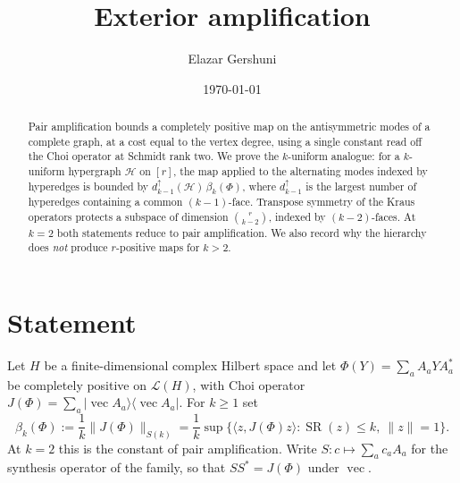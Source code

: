 \documentclass[11pt,reqno]{amsart}
\title{Exterior amplification}
\author{Elazar Gershuni}
\date{\today}
\theoremstyle{plain}
\theoremstyle{remark}
\DeclareMathOperator{\SR}{SR}
\newcommand{\cL}{\mathcal L}
\newcommand{\ketbra}[2]{\lvert #1\rangle\!\langle #2\rvert}
\newcommand{\ip}[2]{\langle #1,#2\rangle}
\newcommand{\norm}[1]{\lVert #1\rVert}
\begin{document}
\begin{abstract}
Pair amplification bounds a completely positive map on the antisymmetric modes
of a complete graph, at a cost equal to the vertex degree, using a single
constant read off the Choi operator at Schmidt rank two.  We prove the
$k$-uniform analogue: for a $k$-uniform hypergraph $\mathcal H$ on $[r]$, the
map applied to the alternating modes indexed by hyperedges is bounded by
$d^\uparrow_{k-1}(\mathcal H)\,\beta_k(\Phi)$, where $d^\uparrow_{k-1}$ is the
largest number of hyperedges containing a common $(k-1)$-face.  Transpose
symmetry of the Kraus operators protects a subspace of dimension
$\binom r{k-2}$, indexed by $(k-2)$-faces.  At $k=2$ both statements reduce to
pair amplification.  We also record why the hierarchy does \emph{not} produce
$r$-positive maps for $k>2$.
\end{abstract}
\maketitle

\section{Statement}

Let $H$ be a finite-dimensional complex Hilbert space and let
$\Phi(Y)=\sum_aA_aYA_a^*$ be completely positive on $\cL(H)$, with Choi operator
$J(\Phi)=\sum_a\ketbra{\operatorname{vec}A_a}{\operatorname{vec}A_a}$.  For
$k\ge1$ set
\begin{equation}
\label{eq:beta}
    \beta_k(\Phi):=\frac1k\norm{J(\Phi)}_{S(k)}
    =\frac1k\sup\bigl\{\ip z{J(\Phi)z}:\SR(z)\le k,\ \norm z=1\bigr\}.
\end{equation}
At $k=2$ this is the constant of pair amplification.  Write
$S:c\mapsto\sum_ac_aA_a$ for the synthesis operator of the family, so that
$SS^*=J(\Phi)$ under $\operatorname{vec}$.
\end{document}
